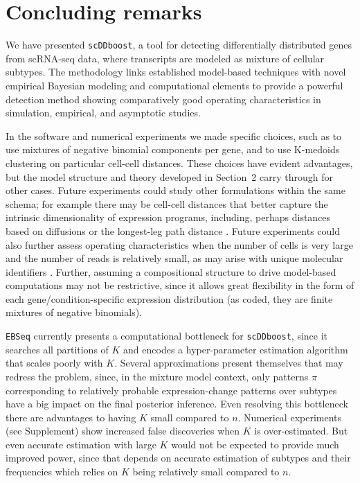 \documentclass[aoas,preprint]{imsart}
\begin{document}
\section{Concluding remarks}

We have presented \verb+scDDboost+,  a tool for
 detecting differentially distributed genes from scRNA-seq data,
where transcripts are modeled as mixture of cellular subtypes. 
The methodology links established model-based
techniques with novel empirical Bayesian 
modeling and computational elements to  provide a powerful detection method showing 
comparatively good operating characteristics in simulation, empirical, and asymptotic studies.

In the software and numerical experiments we made specific choices,
 such as to use mixtures of negative binomial components per gene, and to use K-medoids
clustering on particular cell-cell distances.   These choices have evident advantages, but the 
model structure and theory developed in Section~2 carry through for other cases. Future experiments
could study other formulations within the same schema; for example there may be cell-cell 
distances that better capture the intrinsic dimensionality of expression programs, including, perhaps
distances based on diffusions \citep{Haghverdi:2015aa} or  
the longest-leg path distance \citep{Little2017PathBasedSC}.
Future experiments could also further assess operating characteristics when the number of cells is very large 
and the number of reads is relatively small, as may arise with unique molecular identifiers \citep{Chen:2018aa}.
Further, assuming a compositional structure to drive model-based computations may not be restrictive,
since it allows great flexibility in the form of each gene/condition-specific expression distribution
(as coded, they are finite mixtures of negative binomials).

   
\verb+EBSeq+ currently presents a computational bottleneck for \verb+scDDboost+, since it
searches all partitions of $K$ and encodes a hyper-parameter estimation algorithm that scales poorly with $K$.
Several approximations present themselves that may redress the problem, since,
in the mixture model context, only patterns $\pi$ corresponding to relatively probable expression-change
patterns over subtypes have a big impact on the final posterior inference.   Even resolving this
bottleneck there are advantages to having $K$ small compared to $n$.  Numerical experiments (see Supplement)
show increased false discoveries when $K$ is over-estimated.  But even accurate estimation with large $K$ would
not be expected to provide much improved power, since that depends on accurate estimation of subtypes and their
frequencies which relies on $K$ being relatively small compared to $n$.
\end{document}
